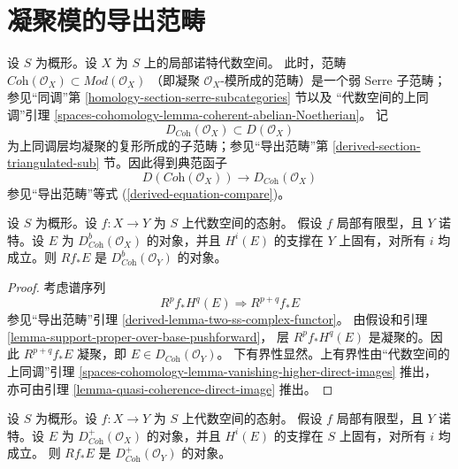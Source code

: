 \section{凝聚模的导出范畴}
\label{section-derived-coherent}

\noindent
设 $S$ 为概形。设 $X$ 为 $S$ 上的局部诺特代数空间。
此时，范畴
$\textit{Coh}(\mathcal{O}_X) \subset \textit{Mod}(\mathcal{O}_X)$
（即凝聚 $\mathcal{O}_X$-模所成的范畴）是一个弱 Serre 子范畴；参见“同调”第
\ref{homology-section-serre-subcategories} 节以及
“代数空间的上同调”引理
\ref{spaces-cohomology-lemma-coherent-abelian-Noetherian}。
记
$$
D_{\textit{Coh}}(\mathcal{O}_X) \subset D(\mathcal{O}_X)
$$
为上同调层均凝聚的复形所成的子范畴；参见“导出范畴”第
\ref{derived-section-triangulated-sub} 节。因此得到典范函子
\begin{equation}
\label{equation-compare-coherent}
D(\textit{Coh}(\mathcal{O}_X))
\longrightarrow
D_{\textit{Coh}}(\mathcal{O}_X)
\end{equation}
参见“导出范畴”等式 (\ref{derived-equation-compare})。

\begin{lemma}
\label{lemma-direct-image-coherent}
设 $S$ 为概形。设 $f : X \to Y$ 为 $S$ 上代数空间的态射。
假设 $f$ 局部有限型，且 $Y$ 诺特。设 $E$ 为
$D^b_{\textit{Coh}}(\mathcal{O}_X)$ 的对象，并且
$H^i(E)$ 的支撑在 $Y$ 上固有，对所有 $i$ 均成立。则 $Rf_*E$ 是
$D^b_{\textit{Coh}}(\mathcal{O}_Y)$ 的对象。
\end{lemma}

\begin{proof}
考虑谱序列
$$
R^pf_*H^q(E) \Rightarrow R^{p + q}f_*E
$$
参见“导出范畴”引理 \ref{derived-lemma-two-ss-complex-functor}。
由假设和引理 \ref{lemma-support-proper-over-base-pushforward}，
层 $R^pf_*H^q(E)$ 是凝聚的。因此
$R^{p + q}f_*E$ 凝聚，即 $E \in D_{\textit{Coh}}(\mathcal{O}_Y)$。 %
下有界性显然。上有界性由“代数空间的上同调”引理
\ref{spaces-cohomology-lemma-vanishing-higher-direct-images} 推出，
亦可由引理 \ref{lemma-quasi-coherence-direct-image} 推出。
\end{proof}

\begin{lemma}
\label{lemma-direct-image-coherent-bdd-below}
设 $S$ 为概形。设 $f : X \to Y$ 为 $S$ 上代数空间的态射。
假设 $f$ 局部有限型，且 $Y$ 诺特。设 $E$ 为
$D^+_{\textit{Coh}}(\mathcal{O}_X)$ 的对象，并且
$H^i(E)$ 的支撑在 $S$ 上固有，对所有 $i$ 均成立。 %
则 $Rf_*E$ 是 $D^+_{\textit{Coh}}(\mathcal{O}_Y)$ 的对象。
\end{lemma}

